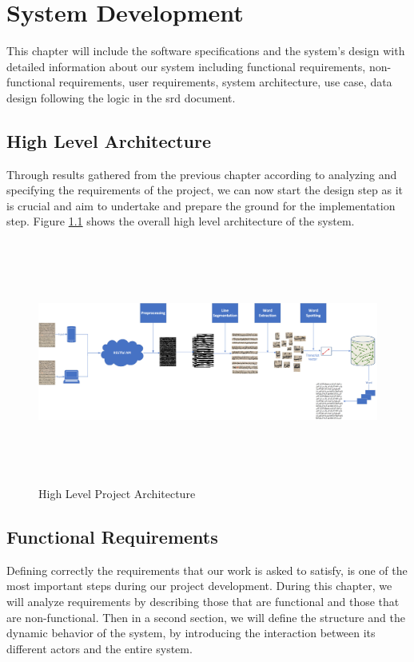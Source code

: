\chapter{System Development}
\label{ch:system-development}
This chapter will include the software specifications and the system's design with detailed information about our system including functional requirements, non-functional requirements, user requirements, system architecture, use case, data design following the logic in the \acrshort{srd} document.

\section{High Level Architecture}
Through results gathered from the previous chapter according to analyzing and specifying the requirements of the project, we can now start the design step as it is crucial and aim to undertake and prepare the ground for the implementation step. Figure \ref{fig:system-architecture} shows the overall high level architecture of the system.

\begin{figure}[!htb]
    \centering
    \includegraphics[width=17cm,height=8cm]{images/system-arch.png}
    \caption{High Level Project Architecture}
    \label{fig:system-architecture}
\end{figure}

\pagebreak

\section{Functional Requirements}
Defining correctly the requirements that our work is asked to satisfy, is one of the most important steps during our project development. During this chapter, we will analyze requirements by describing those that are functional and those that are non-functional. Then in a second section, we will define the structure and the dynamic behavior of the system, by introducing the interaction between its different actors and the entire system. \\

